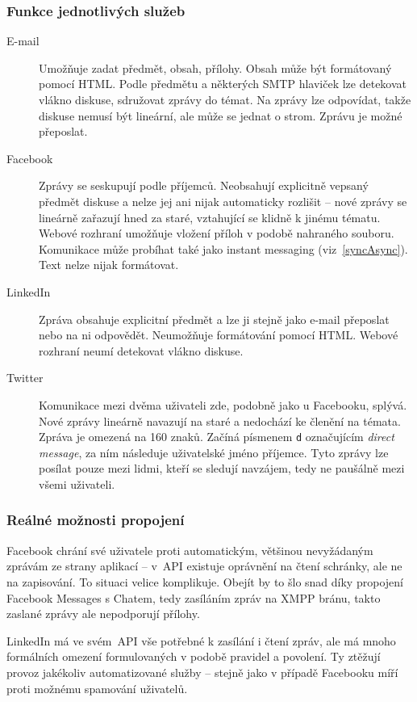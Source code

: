 \documentclass[12pt,oneside,final]{fithesis2}
\begin{document}
\subsubsection*{Funkce jednotlivých služeb}
\begin{description}
    \item[E-mail]
        Umožňuje zadat předmět, obsah, přílohy. Obsah může být formátovaný pomocí HTML. Podle předmětu a některých SMTP hlaviček lze detekovat vlákno diskuse, sdružovat zprávy do témat. Na zprávy lze odpovídat, takže diskuse nemusí být lineární, ale může se jednat o strom. Zprávu je možné přeposlat.

    \item[Facebook]
        Zprávy se seskupují podle příjemců. Neobsahují explicitně vepsaný předmět diskuse a nelze jej ani nijak automaticky rozlišit -- nové zprávy se lineárně zařazují hned za staré, vztahující se klidně k jinému tématu. Webové rozhraní umožňuje vložení příloh v podobě nahraného souboru. Komunikace může probíhat také jako instant messaging (viz~\ref{syncAsync}). Text nelze nijak formátovat.

    \item[LinkedIn]
        Zpráva obsahuje explicitní předmět a lze ji stejně jako e-mail přeposlat nebo na ni odpovědět. Neumožňuje formátování pomocí HTML. Webové rozhraní neumí detekovat vlákno diskuse.

    \item[Twitter]
        Komunikace mezi dvěma uživateli zde, podobně jako u Facebooku, splývá. Nové zprávy lineárně navazují na staré a nedochází ke členění na témata. Zpráva je omezená na 160 znaků. Začíná písmenem {\tt d} označujícím \emph{direct message}, za ním následuje uživatelské jméno příjemce. Tyto zprávy lze posílat pouze mezi lidmi, kteří se sledují navzájem, tedy ne paušálně mezi všemi uživateli.
\end{description}

\subsubsection*{Reálné možnosti propojení}
Facebook chrání své uživatele proti automatickým, většinou nevyžádaným zprávám ze strany aplikací -- v~API existuje oprávnění na čtení schránky, ale ne na zapisování. To situaci velice komplikuje. Obejít by to šlo snad díky propojení Facebook Messages s Chatem, tedy zasíláním zpráv na XMPP bránu, takto zaslané zprávy ale nepodporují přílohy.

LinkedIn má ve svém~API vše potřebné k zasílání i čtení zpráv, ale má mnoho formálních omezení formulovaných v podobě pravidel a povolení. Ty ztěžují provoz jakékoliv automatizované služby -- stejně jako v případě Facebooku míří proti možnému spamování uživatelů.
\end{document}
